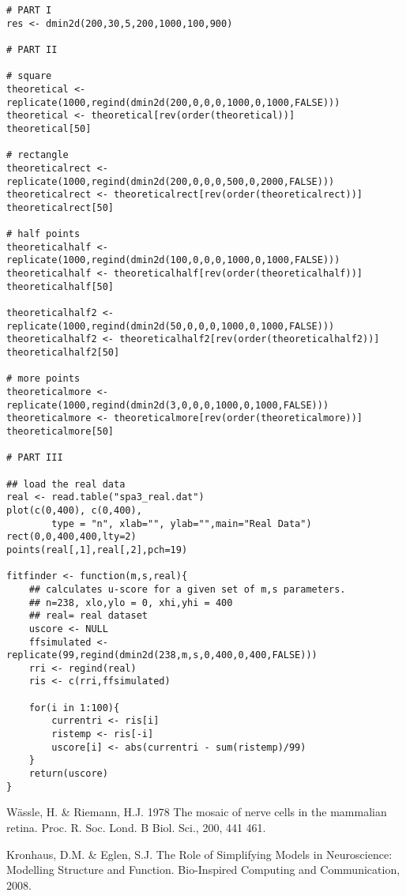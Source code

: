 \documentclass[9pt, oneside, reqno]{article}
\theoremstyle{plain}
\begin{document}
\begin{lstlisting}[language=Renhanced]
# PART I
res <- dmin2d(200,30,5,200,1000,100,900)

# PART II

# square
theoretical <- replicate(1000,regind(dmin2d(200,0,0,0,1000,0,1000,FALSE)))
theoretical <- theoretical[rev(order(theoretical))]
theoretical[50]

# rectangle
theoreticalrect <- replicate(1000,regind(dmin2d(200,0,0,0,500,0,2000,FALSE)))
theoreticalrect <- theoreticalrect[rev(order(theoreticalrect))]
theoreticalrect[50]

# half points
theoreticalhalf <- replicate(1000,regind(dmin2d(100,0,0,0,1000,0,1000,FALSE)))
theoreticalhalf <- theoreticalhalf[rev(order(theoreticalhalf))]
theoreticalhalf[50]

theoreticalhalf2 <- replicate(1000,regind(dmin2d(50,0,0,0,1000,0,1000,FALSE)))
theoreticalhalf2 <- theoreticalhalf2[rev(order(theoreticalhalf2))]
theoreticalhalf2[50]

# more points
theoreticalmore <- replicate(1000,regind(dmin2d(3,0,0,0,1000,0,1000,FALSE)))
theoreticalmore <- theoreticalmore[rev(order(theoreticalmore))]
theoreticalmore[50]

# PART III

## load the real data
real <- read.table("spa3_real.dat")
plot(c(0,400), c(0,400), 
		type = "n", xlab="", ylab="",main="Real Data")
rect(0,0,400,400,lty=2)	
points(real[,1],real[,2],pch=19)

fitfinder <- function(m,s,real){
	## calculates u-score for a given set of m,s parameters.
	## n=238, xlo,ylo = 0, xhi,yhi = 400
	## real= real dataset
	uscore <- NULL
	ffsimulated <- replicate(99,regind(dmin2d(238,m,s,0,400,0,400,FALSE)))
	rri <- regind(real)
	ris <- c(rri,ffsimulated)
	
	for(i in 1:100){
		currentri <- ris[i]
		ristemp <- ris[-i]
		uscore[i] <- abs(currentri - sum(ristemp)/99)
	}
	return(uscore)
}
\end{lstlisting}
\begin{thebibliography}{}
	W\"{a}ssle, H. \& Riemann, H.J. 1978 The mosaic of nerve cells in the mammalian retina. Proc. R. Soc. Lond. B Biol. Sci., 200, 441 461.
	
	Kronhaus, D.M. \& Eglen, S.J. The Role of Simplifying Models in Neuroscience: Modelling Structure and Function. Bio-Inspired Computing and Communication, 2008.
   

\end{thebibliography}
\end{document}
